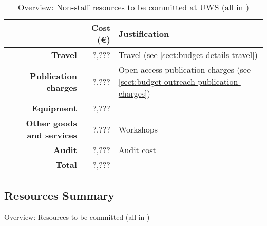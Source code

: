 \bigskip
\begin{table}[H]
\begin{tabular}{|r|r|p{9cm}|}
\hline
\textbf{} & \textbf{Cost (\euro)} & \textbf{Justification} \\\hline
\textbf{Travel} & ?,??? & Travel (see \ref{sect:budget-details-travel})\\\hline
\textbf{Publication charges} & ?,??? & Open access publication charges (see \ref{sect:budget-outreach-publication-charges})\\\hline
\textbf{Equipment} & ?,??? &  \\\hline    %

\textbf{Other goods and services} & ?,??? & Workshops \\\hline   %
\textbf{Audit} & ?,??? & Audit cost \\\hline
\textbf{Total} & ?,???\\\cline{1-2}
\end{tabular}
\caption{Overview: Non-staff resources to be committed at UWS (all in \texteuro)}\vspace*{-1em}
\end{table}


















\subsection{Resources Summary}

\begin{table}[ht]\centering
\caption{Overview: Resources to be committed (all in \texteuro)}\label{tab:resources}\vspace*{-1em}
\end{table}

